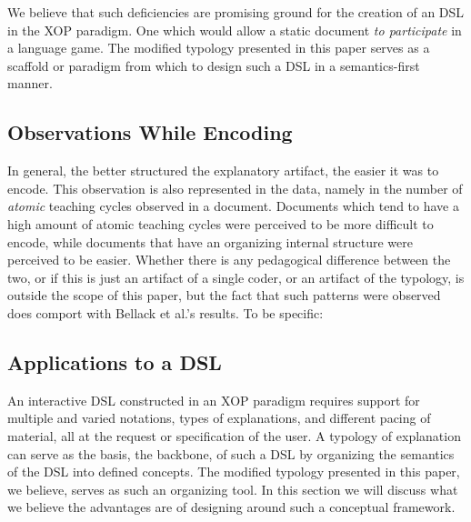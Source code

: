 \documentclass[conference]{IEEEtran}
\begin{document}
We believe that such deficiencies are promising ground for the creation of an
DSL in the XOP paradigm. One which would allow a static document \emph{to
  participate} in a language game. The modified typology presented in this
paper serves as a scaffold or paradigm from which to design such a DSL in a
semantics-first \cite{EW11sle} manner.

\subsection{Observations While Encoding}
In general, the better structured the explanatory artifact, the easier it was to
encode. This observation is also represented in the data, namely in the number
of \emph{atomic} teaching cycles observed in a document. Documents which tend to
have a high amount of atomic teaching cycles were perceived to be more difficult
to encode, while documents that have an organizing internal structure were
perceived to be easier. Whether there is any pedagogical difference between the
two, or if this is just an artifact of a single coder, or an artifact of the
typology, is outside the scope of this paper, but the fact that such patterns
were observed does comport with Bellack et al.'s results. To be specific:


\subsection{Applications to a DSL}
\label{sec:res:dsl}
An interactive DSL constructed in an XOP paradigm requires support for multiple
and varied notations, types of explanations, and different pacing of material,
all at the request or specification of the user. A typology of explanation can
serve as the basis, the backbone, of such a DSL by organizing the semantics of
the DSL into defined concepts. The modified typology presented in this paper, we
believe, serves as such an organizing tool. In this section we will discuss what
we believe the advantages are of designing around such a conceptual framework.
\end{document}
